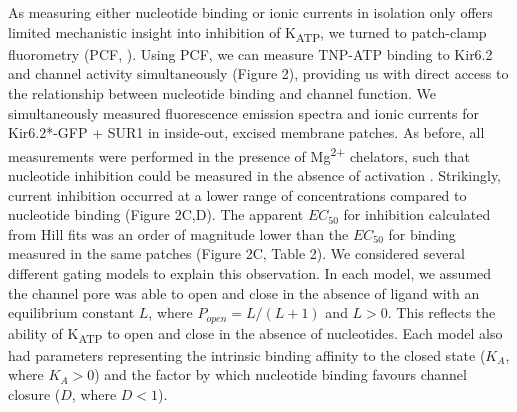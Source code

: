 \documentclass[10pt,lineno, doublespacing]{elife_modified}
\begin{document}
As measuring either nucleotide binding or ionic currents in isolation only offers limited mechanistic insight into inhibition of K\textsubscript{ATP}, we turned to patch-clamp fluorometry (PCF, \cite{RN51, RN114}).
Using PCF, we can measure TNP-ATP binding to Kir6.2 and channel activity simultaneously (Figure 2), providing us with direct access to the relationship between nucleotide binding and channel function.
We simultaneously measured fluorescence emission spectra and ionic currents for Kir6.2*-GFP + SUR1 in inside-out, excised membrane patches.
As before, all measurements were performed in the presence of Mg\textsuperscript{2+} chelators, such that nucleotide inhibition could be measured in the absence of activation \citep{RN10, RN82}.
Strikingly, current inhibition occurred at a lower range of concentrations compared to nucleotide binding (Figure 2C,D). The apparent $EC_{50}$ for inhibition calculated from Hill fits was an order of magnitude lower than the $EC_{50}$ for binding measured in the same patches (Figure 2C, Table 2).
We considered several different gating models to explain this observation.
In each model, we assumed the channel pore was able to open and close in the absence of ligand with an equilibrium constant $L$, where $P_{open} = L/(L + 1)$ and $L > 0$.
This reflects the ability of K\textsubscript{ATP} to open and close in the absence of nucleotides.
Each model also had parameters representing the intrinsic binding affinity to the closed state ($K_A$, where $K_A > 0$) and the factor by which nucleotide binding favours channel closure ($D$, where $D < 1$).
\end{document}
